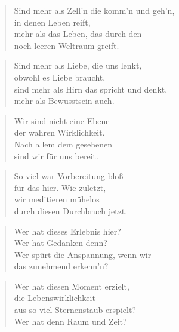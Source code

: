 \documentclass[10pt,a4paper]{article}
\begin{document}
\begin{multicols}{2}
\begin{verse}
Sind mehr als Zell’n die komm’n und geh’n, \\
in denen Leben reift, \\
mehr als das Leben, das durch den \\
noch leeren Weltraum greift. \\
\end{verse}

\begin{verse}
Sind mehr als Liebe, die uns lenkt, \\
obwohl es Liebe braucht, \\
sind mehr als Hirn das spricht und denkt, \\
mehr als Bewusstsein auch. \\
\end{verse}

\begin{verse}
Wir sind nicht eine Ebene \\
der wahren Wirklichkeit. \\
Nach allem dem gesehenen \\
sind wir für uns bereit. \\
\end{verse}

\begin{verse}
So viel war Vorbereitung bloß \\
für das hier. Wie zuletzt, \\
wir meditieren mühelos \\
durch diesen Durchbruch jetzt. \\
\end{verse}

\begin{verse}
Wer hat dieses Erlebnis hier? \\
Wer hat Gedanken denn? \\
Wer spürt die Anspannung, wenn wir \\
das zunehmend erkenn’n? \\
\end{verse}

\begin{verse}
Wer hat diesen Moment erzielt, \\
die Lebenswirklichkeit \\
aus so viel Sternenstaub erspielt? \\
Wer hat denn Raum und Zeit? \\
\end{verse}


\end{multicols}
\end{document}
